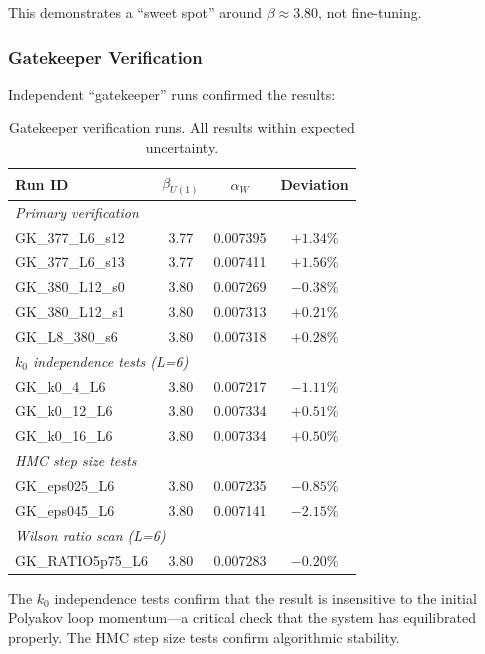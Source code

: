 This demonstrates a ``sweet spot'' around $\beta \approx 3.80$, not fine-tuning.

\subsubsection{Gatekeeper Verification}

Independent ``gatekeeper'' runs confirmed the results:

\begin{table}[h]
\centering
\caption{Gatekeeper verification runs. All results within expected uncertainty.}\label{tab:gatekeeper}
\begin{tabular}{lccc}
\toprule
Run ID & $\beta_{U(1)}$ & $\alpha_W$ & Deviation \\
\midrule
\multicolumn{4}{l}{\textit{Primary verification}} \\
GK\_377\_L6\_s12 & 3.77 & 0.007395 & $+1.34\%$ \\
GK\_377\_L6\_s13 & 3.77 & 0.007411 & $+1.56\%$ \\
GK\_380\_L12\_s0 & 3.80 & 0.007269 & $-0.38\%$ \\
GK\_380\_L12\_s1 & 3.80 & 0.007313 & $+0.21\%$ \\
GK\_L8\_380\_s6 & 3.80 & 0.007318 & $+0.28\%$ \\
\midrule
\multicolumn{4}{l}{\textit{$k_0$ independence tests (L=6)}} \\
GK\_k0\_4\_L6 & 3.80 & 0.007217 & $-1.11\%$ \\
GK\_k0\_12\_L6 & 3.80 & 0.007334 & $+0.51\%$ \\
GK\_k0\_16\_L6 & 3.80 & 0.007334 & $+0.50\%$ \\
\midrule
\multicolumn{4}{l}{\textit{HMC step size tests}} \\
GK\_eps025\_L6 & 3.80 & 0.007235 & $-0.85\%$ \\
GK\_eps045\_L6 & 3.80 & 0.007141 & $-2.15\%$ \\
\midrule
\multicolumn{4}{l}{\textit{Wilson ratio scan (L=6)}} \\
GK\_RATIO5p75\_L6 & 3.80 & 0.007283 & $-0.20\%$ \\
\bottomrule
\end{tabular}
\end{table}

\noindent The $k_0$ independence tests confirm that the result is insensitive to the initial Polyakov loop momentum---a critical check that the system has equilibrated properly. The HMC step size tests confirm algorithmic stability.

